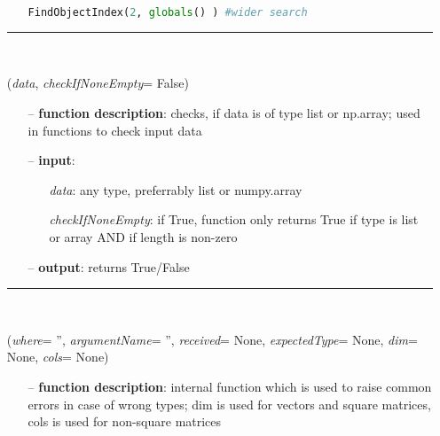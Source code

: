 \begin{itemize}[leftmargin=1.4cm]
\begin{itemize}[leftmargin=0.7cm]
\begin{lstlisting}[language=Python, xleftmargin=36pt]
  FindObjectIndex(2, globals() ) #wider search
\end{lstlisting}\vspace{-24pt}\bi\item[]\vspace{-24pt}\vspace{12pt}\end{itemize}
%
\noindent\rule{8cm}{0.75pt}\vspace{1pt} \\ 
\begin{flushleft}
\label{sec:advancedUtilities:IsListOrArray}
({\it data}, {\it checkIfNoneEmpty}= False)
\end{flushleft}
\setlength{\itemindent}{0.7cm}
\begin{itemize}[leftmargin=0.7cm]
\item[--]
{\bf function description}: checks, if data is of type list or np.array; used in functions to check input data
\item[--]
{\bf input}: \vspace{-6pt}
\begin{itemize}[leftmargin=1.2cm]
\setlength{\itemindent}{-0.7cm}
\item[]{\it data}: any type, preferrably list or numpy.array
\item[]{\it checkIfNoneEmpty}: if True, function only returns True if type is list or array AND if length is non-zero
\end{itemize}
\item[--]
{\bf output}: returns True/False
\vspace{12pt}\end{itemize}
%
\noindent\rule{8cm}{0.75pt}\vspace{1pt} \\ 
\begin{flushleft}
\label{sec:advancedUtilities:RaiseTypeError}
({\it where}= '', {\it argumentName}= '', {\it received}= None, {\it expectedType}= None, {\it dim}= None, {\it cols}= None)
\end{flushleft}
\setlength{\itemindent}{0.7cm}
\begin{itemize}[leftmargin=0.7cm]
\item[--]
{\bf function description}: internal function which is used to raise common errors in case of wrong types; dim is used for vectors and square matrices, cols is used for non-square matrices

\end{itemize}
\end{itemize}
